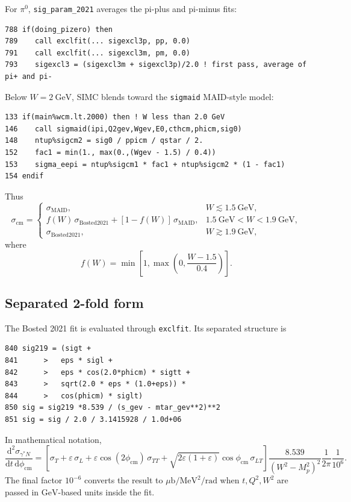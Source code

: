 \documentclass[11pt]{article}
\newcommand{\dd}{\mathrm{d}}
\newcommand{\ub}{\mu\mathrm{b}}
\newcommand{\MeV}{\mathrm{MeV}}
\newcommand{\GeV}{\mathrm{GeV}}
\newcommand{\eps}{\varepsilon}
\newcommand{\phicm}{\phi_{\mathrm{cm}}}
\begin{document}
For \(\pi^0\), \texttt{sig\_param\_2021} averages the pi-plus and pi-minus fits:
\begin{lstlisting}
788 if(doing_pizero) then
789    call exclfit(... sigexcl3p, pp, 0.0)
791    call exclfit(... sigexcl3m, pm, 0.0)
793    sigexcl3 = (sigexcl3m + sigexcl3p)/2.0 ! first pass, average of pi+ and pi-
\end{lstlisting}

Below \(W=2~\GeV\), SIMC blends toward the \texttt{sigmaid} MAID-style model:
\begin{lstlisting}
133 if(main%wcm.lt.2000) then ! W less than 2.0 GeV
146    call sigmaid(ipi,Q2gev,Wgev,E0,cthcm,phicm,sig0)
148    ntup%sigcm2 = sig0 / ppicm / qstar / 2.
152    fac1 = min(1., max(0.,(Wgev - 1.5) / 0.4))
153    sigma_eepi = ntup%sigcm1 * fac1 + ntup%sigcm2 * (1 - fac1)
154 endif
\end{lstlisting}

Thus
\[
  \sigma_{\mathrm{cm}}
  =
  \begin{cases}
    \sigma_{\mathrm{MAID}}, & W \lesssim 1.5~\GeV,\\
    f(W)\,\sigma_{\mathrm{Bosted2021}}
      +[1-f(W)]\,\sigma_{\mathrm{MAID}},
      & 1.5~\GeV < W < 1.9~\GeV,\\
    \sigma_{\mathrm{Bosted2021}}, & W \gtrsim 1.9~\GeV,
  \end{cases}
\]
where
\[
  f(W)=\min\left[1,\max\left(0,\frac{W-1.5}{0.4}\right)\right].
\]

\subsection{Separated 2-fold form}

The Bosted 2021 fit is evaluated through \texttt{exclfit}.  Its separated
structure is
\begin{lstlisting}
840 sig219 = (sigt +
841      >   eps * sigl +
842      >   eps * cos(2.0*phicm) * sigtt +
843      >   sqrt(2.0 * eps * (1.0+eps)) *
844      >   cos(phicm) * siglt)
850 sig = sig219 *8.539 / (s_gev - mtar_gev**2)**2
851 sig = sig / 2.0 / 3.1415928 / 1.0d+06
\end{lstlisting}

In mathematical notation,
\[
  \frac{\dd^2\sigma_{\gamma^*N}}
       {\dd t\,\dd\phicm}
  =
  \left[
    \sigma_T
    +\eps\,\sigma_L
    +\eps\cos(2\phicm)\,\sigma_{TT}
    +\sqrt{2\eps(1+\eps)}\cos\phicm\,\sigma_{LT}
  \right]
  \frac{8.539}{(W^2-M_p^2)^2}
  \frac{1}{2\pi}
  \frac{1}{10^6}.
\]
The final factor \(10^{-6}\) converts the result to \(\ub/\MeV^2/\mathrm{rad}\)
when \(t,Q^2,W^2\) are passed in \(\GeV\)-based units inside the fit.
\end{document}

